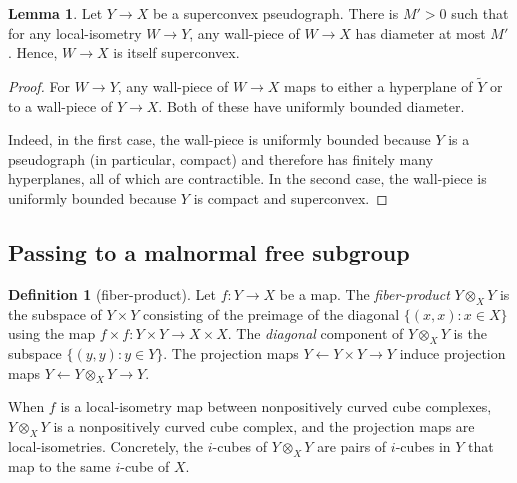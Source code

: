 \documentclass[12pt,oneside]{amsart}
\theoremstyle{definition}
\newtheorem{lem}[thm]{Lemma}
\theoremstyle{definition}
\newtheorem{defn}[thm]{Definition}
\theoremstyle{remark}
\begin{document}
\begin{lem}\label{lem:bounded wall pieces}
Let $Y \rightarrow X$ be a  superconvex pseudograph. 
There is $M'>0$ such that for any local-isometry $W\rightarrow Y$, any wall-piece of $W\rightarrow X$ has diameter at most $M'$. Hence, $W \rightarrow X$ is itself superconvex.
\end{lem}

\begin{proof}
For $W\rightarrow Y$, any wall-piece of $W\rightarrow X$  maps  to either a hyperplane of $\widetilde Y$ or to a wall-piece of $Y\rightarrow X$. Both of these have uniformly bounded diameter.

Indeed, in the first case, the wall-piece is uniformly bounded because $Y$ is a pseudograph (in particular, compact) and therefore has finitely many hyperplanes, all of which are contractible. In the second case,  the wall-piece  is  uniformly bounded  because $Y$ is compact and superconvex.
\end{proof}

\subsection{Passing to a malnormal free subgroup}\label{sec: passing to malnormal}

\begin{defn}[fiber-product]
Let $f:Y\rightarrow X$ be a map.
The \emph{fiber-product} $Y \otimes_X Y$ is the subspace of $Y\times Y$
consisting of the preimage of the diagonal $\{(x,x): x \in X\}$ using the map
$f\times f : Y\times Y \rightarrow X\times X$.
The \emph{diagonal} component of $Y\otimes_X Y$ is the subspace $\{(y,y): y\in Y\}$.
The projection maps $Y \leftarrow Y\times Y\rightarrow Y$ induce projection maps
 $Y \leftarrow Y\otimes_X Y\rightarrow Y$.
 
When $f$ is a local-isometry  map between nonpositively curved cube complexes,  $Y\otimes_X Y$ is a  nonpositively curved cube complex, and the projection maps are local-isometries.
Concretely, the $i$-cubes of $Y \otimes_X Y$ are pairs of $i$-cubes in $Y$ that map to the same $i$-cube of $X$.

\end{defn}
\end{document}
